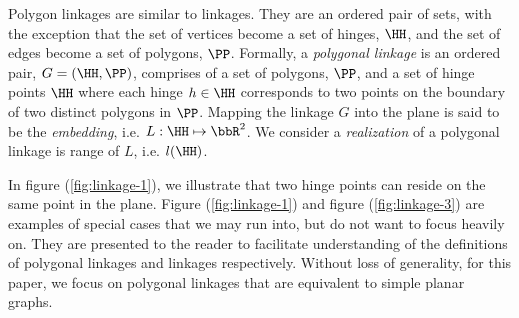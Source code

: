 Polygon linkages are similar to linkages.  They are an ordered pair of sets, with the exception 
that the set of vertices become a set of hinges, $\HH$, and the set of edges become a set of 
polygons, $\PP$.  Formally, a \textit{polygonal linkage} is an ordered pair, $G = (\HH,\PP)$,  
comprises of a set of polygons, $\PP$, and a set of hinge points $\HH$ where each hinge $h \in \HH$ 
corresponds to two points on the boundary of two distinct polygons in $\PP$. Mapping the linkage 
$G$ into the plane is said to be the \textit{embedding}, i.e. $L : \HH \mapsto \bbR^{2}$.  We 
consider a \textit{realization} of a polygonal linkage is range of $L$, i.e. $l(\HH)$.

In figure (\ref{fig:linkage-1}), we illustrate that two hinge points can reside on the same point 
in the plane. Figure (\ref{fig:linkage-1}) and figure (\ref{fig:linkage-3}) are examples of special 
cases that we may run into, but do not want to focus heavily on.  They are presented to the reader 
to facilitate understanding of the definitions of polygonal linkages and linkages respectively.  
Without loss of generality, for this paper, we focus on polygonal linkages that are 
equivalent to simple planar graphs.
